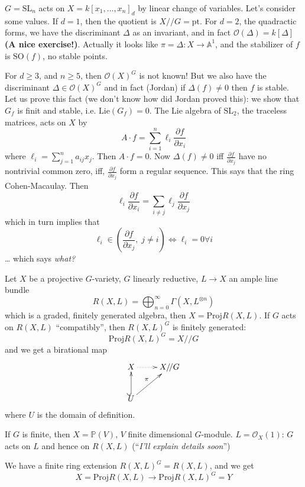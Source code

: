 \begin{example}
\label{example-action-of-SL2-on-forms}
$G=\text{SL}_n$ acts on
$X=k[x_1,\ldots,x_n]_d$ by linear change of
variables. Let's consider some values. If
$d=1$, then the quotient is
$X/\!/G=\text{pt}$. For $d=2$, the quadractic
forms, we have the discriminant $\Delta$ as
an invariant, and in fact
$\mathcal{O}(\Delta)=k[\Delta]$ {\bf (A nice
exercise!)}. Actually it looks like
$\pi=\Delta:X \to \mathbb{A}^1$, and the
stabilizer of $f$ is $\text{SO}(f)$, no
stable points.

For $d \geq 3$, and $n \geq 5$, then
$\mathcal{O}(X)^G$ is not known! But we also
have the discriminant $\Delta \in
\mathcal{O}(X)^G$ and in fact (Jordan) if
$\Delta(f) \neq 0$ then $f$ is stable. Let us
prove this fact (we don't know how did Jordan
proved this): we show that $G_f$ is finit and
stable, i.e. $\text{Lie}(G_f)=0$. The Lie
algebra of $\text{SL}_2$, the traceless
matrices, acts on $X$ by
$$
A\cdot f= \sum_{i=1}^n \ell_i \frac{\partial
f}{\partial x_i}
$$
where $\ell_i = \sum_{j=1}^n a_{ij}x_j$. Then
$A\cdot f=0$. Now $\Delta(f) \neq 0$ iff
$\frac{\partial f}{\partial x_j}$ have no
nontrivial common zero, iff, $\frac{\partial
f}{\partial x_j}$ form a regular sequence.
This says that the ring Cohen-Macaulay. Then
$$
\ell_i \frac{\partial f}{\partial x_i}
=\sum_{i \neq  j}\ell_j \frac{\partial
f}{\partial x_j}
$$
which in turn implies that
$$
\ell_i \in \left(\frac{\partial f}{\partial
x_j}, \; j \neq  i\right)
\iff \ell_i=0 \forall  i
$$
\ldots{} which says {\it what?}
\end{example}

\medskip\noindent
Let $X$ be a projective $G$-variety, $G$
linearly reductive, $L \to X$ an ample line
bundle
$$
R(X,L)=\bigoplus_{n=0}^{\infty}
\Gamma(X,L^{\otimes n})
$$
which is a graded, finitely generated
algebra, then $X=\text{Proj}R(X,L)$. If $G$
acts on $R(X,L)$ ``compatibly'', then
$R(X,L)^G$ is finitely generated:
$$
\text{Proj}R(X,L)^G=X/\!/G
$$
and we get a birational map
$$
\xymatrix{
X\ar@{.>}[r]& X/\!/G\\
U\ar@{^{(}->}[u]\ar[ur]^{\pi}
}
$$
where $U$ is the domain of definition.

If $G$ is finite, then  $X= \mathbb{P}(V)$,
$V$ finite dimensional $G$-module. $L =
\mathcal{O}_X(1)$: $G$ acts on $L$ and hence
on $R(X,L)$ (``{\it I'll explain details
soon}'')

We have a finite ring extension $R(X,L)^G =
R(X,L)$, and we get
$$
X=\text{Proj}R(X,L) \to \text{Proj}R(X,L)^G=Y
$$

